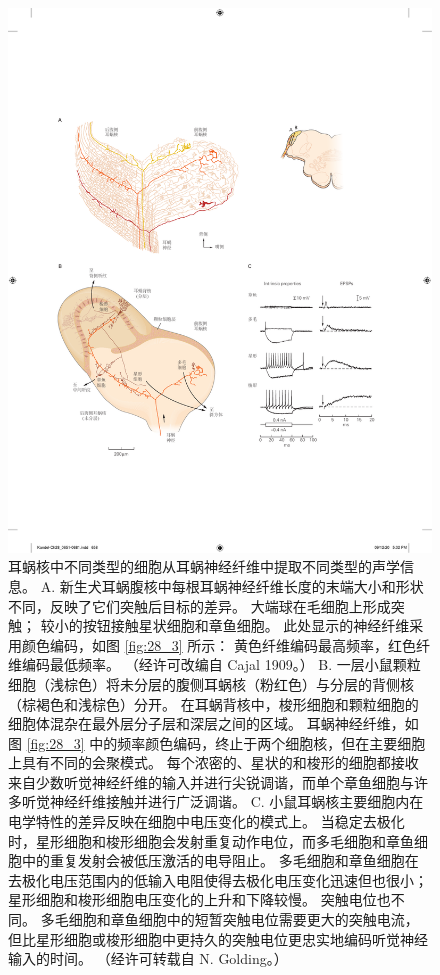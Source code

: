 \begin{figure}[htbp]
	\centering
	\includegraphics[width=0.9\linewidth]{chap28/fig_28_4}
	\caption{耳蜗核中不同类型的细胞从耳蜗神经纤维中提取不同类型的声学信息。
		A. 新生犬耳蜗腹核中每根耳蜗神经纤维长度的末端大小和形状不同，反映了它们突触后目标的差异。 
		大端球在毛细胞上形成突触； 
		较小的按钮接触星状细胞和章鱼细胞。 
		此处显示的神经纤维采用颜色编码，如图 \ref{fig:28_3} 所示：
		黄色纤维编码最高频率，红色纤维编码最低频率。 （经许可改编自 Cajal 1909。） 
		B. 一层小鼠颗粒细胞（浅棕色）将未分层的腹侧耳蜗核（粉红色）与分层的背侧核（棕褐色和浅棕色）分开。 
		在耳蜗背核中，梭形细胞和颗粒细胞的细胞体混杂在最外层分子层和深层之间的区域。
		耳蜗神经纤维，如图 \ref{fig:28_3} 中的频率颜色编码，终止于两个细胞核，但在主要细胞上具有不同的会聚模式。
		每个浓密的、星状的和梭形的细胞都接收来自少数听觉神经纤维的输入并进行尖锐调谐，而单个章鱼细胞与许多听觉神经纤维接触并进行广泛调谐。
		C. 小鼠耳蜗核主要细胞内在电学特性的差异反映在细胞中电压变化的模式上。
		当稳定去极化时，星形细胞和梭形细胞会发射重复动作电位，而多毛细胞和章鱼细胞中的重复发射会被低压激活的电导阻止。
		多毛细胞和章鱼细胞在去极化电压范围内的低输入电阻使得去极化电压变化迅速但也很小； 
		星形细胞和梭形细胞电压变化的上升和下降较慢。
		突触电位也不同。
		多毛细胞和章鱼细胞中的短暂突触电位需要更大的突触电流，但比星形细胞或梭形细胞中更持久的突触电位更忠实地编码听觉神经输入的时间。 （经许可转载自 N. Golding。）}
	\label{fig:28_4}
\end{figure}


